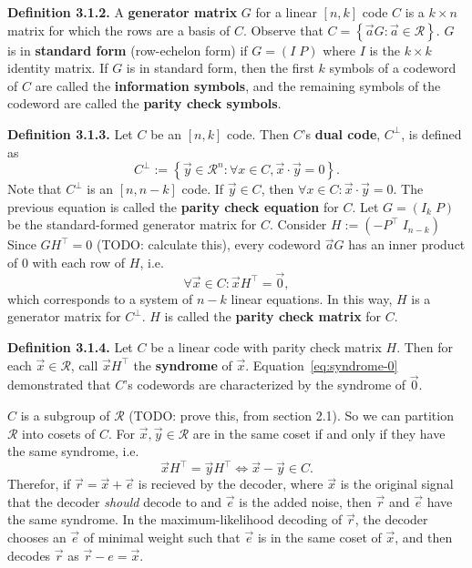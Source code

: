 \documentclass{article}
\newcommand{\calR}{\mathcal{R}}
\newcommand{\dual}[1]{#1^\bot}
\newcommand{\trans}[1]{#1^\top}
\renewcommand{\=}{\equiv}
\newcommand{\set}[1]{\left\{ #1 \right\}}
\renewcommand{\v}{\vec}
\newcommand{\x}{{\v x}}
\newcommand{\y}{{\v y}}
\newcommand{\definition}[1]{\vspace{1em}\noindent\textbf{Definition #1.} }
\newcommand{\TODO}[1]{(TODO: #1)}
\begin{document}
\definition{3.1.2}
A \textbf{generator matrix} $G$ for a linear $[n,k]$ code $C$ is a $k \times n$ matrix for which the rows are a basis of $C$.
Observe that $C = \set{ \v a G : \v a \in \calR }$.
$G$ is in \textbf{standard form} (row-echelon form) if $G = (I \; P)$ where $I$ is the $k \times k$ identity matrix.
If $G$ is in standard form, then the first $k$ symbols of a codeword of $C$ are called the \textbf{information symbols}, and the remaining symbols of the codeword are called the \textbf{parity check symbols}.

\definition{3.1.3}
Let $C$ be an $[n,k]$ code. Then $C$'s \textbf{dual code}, $\dual C$, is defined as
$$ \dual C := \set{ \y \in \calR^n : \forall x \in C, \x \cdot \y = 0 }. $$
Note that $\dual C$ is an $[n, n-k]$ code.
If $\y \in C$, then $\forall x \in C : \x \cdot \y = 0$. The previous equation is called the \textbf{parity check equation} for $C$.
Let $G = (I_k \; P)$ be the standard-formed generator matrix for $C$.
Consider $H := (-\trans P \; I_{n-k})$
Since $G \trans H = 0$ \TODO{calculate this}, every codeword $\v a G$ has an inner product of 0 with each row of $H$, i.e.
\begin{equation}
  \label{eq:syndrome-0}
  \forall \x \in C : \x \trans H = \v 0,
\end{equation}
which corresponds to a system of $n-k$ linear equations.
In this way, $H$ is a generator matrix for $\dual C$.
$H$ is called the \textbf{parity check matrix} for $C$.

\definition{3.1.4}
Let $C$ be a linear code with parity check matrix $H$.
Then for each $\v x \in \calR$, call $\x \trans H$ the \textbf{syndrome} of $\x$.
Equation~\ref{eq:syndrome-0} demonstrated that $C$'s codewords are characterized by the syndrome of $\v 0$.

$C$ is a subgroup of $\calR$ \TODO{prove this, from section 2.1}.
So we can partition $\calR$ into cosets of $C$.
For $\x, \y \in \calR$ are in the same coset if and only if they have the same syndrome, i.e.
$$ \x \trans H = \y \trans H \iff \x - \y \in C. $$
Therefor, if $\v r = \x + \v e$ is recieved by the decoder, where $\x$ is the original signal that the decoder \textit{should} decode to and $\v e$ is the added noise, then $\v r$ and $\v e$ have the same syndrome.
In the maximum-likelihood decoding of $\v r$, the decoder chooses an $\v e$ of minimal weight such that $\v e$ is in the same coset of $\x$, and then decodes $\v r$ as $\v r - e = \v x$.
\end{document}
